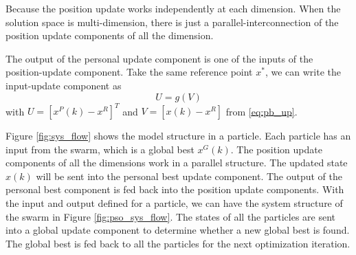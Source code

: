 Because the position update works independently at each dimension.
When the solution space is multi-dimension, there is just a parallel-interconnection of the position update components of all the dimension.

The output of the personal update component is one of the inputs of the position-update component.
Take the same reference point $ x^{*} $, we can write the input-update component as 
\begin{equation}
\label{eq:pso_input_up}
U = g(V)
\end{equation}
with $ U = [ x^{P}(k) - x^{R} ]^{T} $ 
and $ V = [ x(k) - x^{R} ] $
from \eqref{eq:pb_up}. 

Figure \ref{fig:sys_flow} shows the model structure in a particle.
Each particle has an input from the swarm, which is a global best $ x^{G} (k) $.
The position update components of all the dimensions work in a parallel structure.
The updated state $ x (k) $ will be sent into the personal best update component.
The output of the personal best component is fed back into the position update components.
With the input and output defined for a particle, we can have the system structure of the swarm in Figure \ref{fig:pso_sys_flow}.
The states of all the particles are sent into a global update component to determine whether a new global best is found.
The global best is fed back to all the particles for the next optimization iteration.

